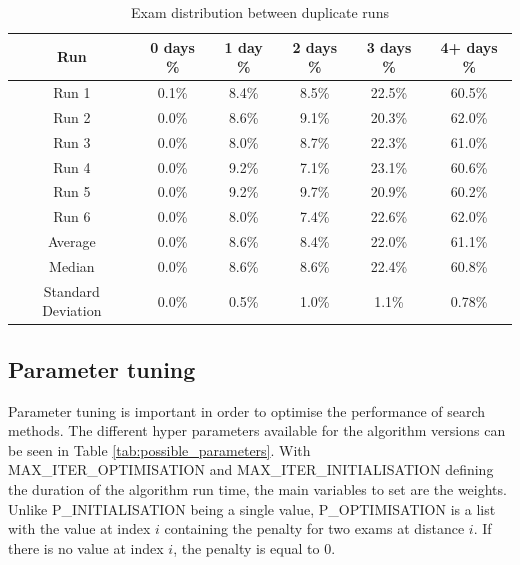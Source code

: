 \begin{table}[h]
	\caption{Exam distribution between duplicate runs}
	\label{tab:multiple_runs}
	\centering
	\begin{tabular}{c c c c c c}
		\hline
  	\textbf{Run}	&
   \textbf{0 days \% } &
    \textbf{1 day \% } & 
    \textbf{2 days \% } &
    \textbf{3 days \% } & 
    \textbf{4+ days \%}\\ \hline
    Run 1 & 0.1\% & 8.4\% & 8.5\% & 22.5\% & 60.5\% \\
    Run 2 & 0.0\% & 8.6\% & 9.1\% & 20.3\% & 62.0\% \\
    Run 3 & 0.0\% & 8.0\% & 8.7\% & 22.3\% & 61.0\% \\
    Run 4 & 0.0\% & 9.2\% & 7.1\% & 23.1\% & 60.6\% \\
    Run 5& 0.0\% & 9.2\% & 9.7\% & 20.9\% & 60.2\% \\
    Run 6 & 0.0\% & 8.0\% & 7.4\% & 22.6\% & 62.0\% \\ \hline
    
    Average& 0.0\% & 8.6\% & 8.4\% & 22.0\% & 61.1\%\\
    Median & 0.0\% & 8.6\% & 8.6\% & 22.4\% & 60.8\% \\\hline
    
    Standard Deviation & 0.0\% & 0.5\% & 1.0\% & 1.1\% & 0.78\%\\
        \hline
	\end{tabular}
\end{table}

\subsection{Parameter tuning} \label{tuning}

Parameter tuning is important in order to optimise the performance of search methods. The different hyper parameters  available for the algorithm versions can be seen in Table \ref{tab:possible_parameters}. With MAX\_ITER\_OPTIMISATION and MAX\_ITER\_INITIALISATION defining the duration of the algorithm run time, the main variables to set are the weights. Unlike P\_INITIALISATION being a single value, P\_OPTIMISATION is a list with the value at index $i$ containing the penalty for two exams at distance $i$. If there is no value at index $i$, the penalty is equal to 0.

